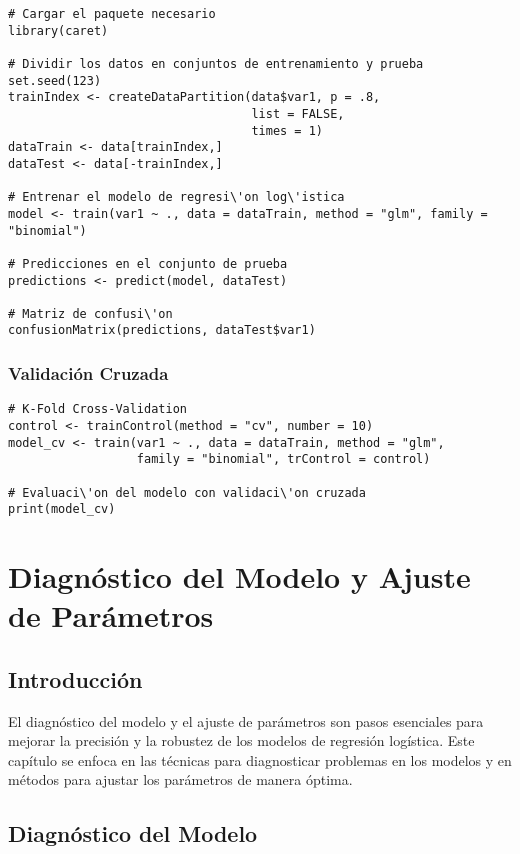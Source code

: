 \documentclass[a4paper]{report} %
\begin{document}
\begin{verbatim}
# Cargar el paquete necesario
library(caret)

# Dividir los datos en conjuntos de entrenamiento y prueba
set.seed(123)
trainIndex <- createDataPartition(data$var1, p = .8, 
                                  list = FALSE, 
                                  times = 1)
dataTrain <- data[trainIndex,]
dataTest <- data[-trainIndex,]

# Entrenar el modelo de regresi\'on log\'istica
model <- train(var1 ~ ., data = dataTrain, method = "glm", family = "binomial")

# Predicciones en el conjunto de prueba
predictions <- predict(model, dataTest)

# Matriz de confusi\'on
confusionMatrix(predictions, dataTest$var1)
\end{verbatim}

\subsection{Validaci\'on Cruzada}

\begin{verbatim}
# K-Fold Cross-Validation
control <- trainControl(method = "cv", number = 10)
model_cv <- train(var1 ~ ., data = dataTrain, method = "glm", 
                  family = "binomial", trControl = control)

# Evaluaci\'on del modelo con validaci\'on cruzada
print(model_cv)
\end{verbatim}



\chapter{Diagn\'ostico del Modelo y Ajuste de Par\'ametros}


\section{Introducci\'on}

El diagn\'ostico del modelo y el ajuste de par\'ametros son pasos esenciales para mejorar la precisi\'on y la robustez de los modelos de regresi\'on log\'istica. Este cap\'itulo se enfoca en las t\'ecnicas para diagnosticar problemas en los modelos y en m\'etodos para ajustar los par\'ametros de manera \'optima.

\section{Diagn\'ostico del Modelo}
\end{document}
